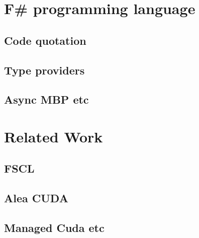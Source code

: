 \section{F\# programming language}
\subsection{Code quotation}
\subsection{Type providers}
\subsection{Async MBP etc}

\section{Related Work}
\subsection{FSCL}
\subsection{Alea CUDA}
\subsection{Managed Cuda etc}